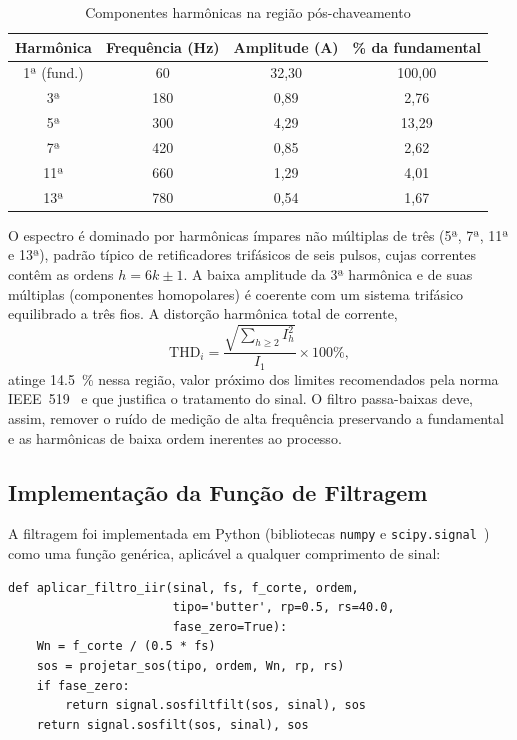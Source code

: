 \documentclass[conference]{IEEEtran}
\begin{document}
\begin{table}[!t]
\caption{Componentes harmônicas na região pós-chaveamento}
\label{tab:harmonicos}
\centering
\begin{tabular}{cccc}
\toprule
Harmônica & Frequência (Hz) & Amplitude (A) & \% da fundamental \\
\midrule
1ª (fund.) & 60  & 32,30 & 100,00 \\
3ª  & 180 & 0,89  & 2,76 \\
5ª  & 300 & 4,29  & 13,29 \\
7ª  & 420 & 0,85  & 2,62 \\
11ª & 660 & 1,29  & 4,01 \\
13ª & 780 & 0,54  & 1,67 \\
\bottomrule
\end{tabular}
\end{table}

O espectro é dominado por harmônicas ímpares não múltiplas de três
(5ª, 7ª, 11ª e 13ª), padrão típico de retificadores trifásicos de seis pulsos,
cujas correntes contêm as ordens $h = 6k \pm 1$. A baixa amplitude da 3ª harmônica
e de suas múltiplas (componentes homopolares) é coerente com um sistema trifásico
equilibrado a três fios. A distorção harmônica total de corrente,
\begin{equation}
\mathrm{THD}_i = \frac{\sqrt{\sum_{h \ge 2} I_h^2}}{I_1}\times 100\%,
\label{eq:thd}
\end{equation}
atinge \SI{14.5}{\percent} nessa região, valor próximo dos limites recomendados
pela norma IEEE~519~\cite{ieee519} e que justifica o tratamento do sinal. O filtro
passa-baixas deve, assim, remover o ruído de medição de alta frequência
preservando a fundamental e as harmônicas de baixa ordem inerentes ao processo.

\subsection{Implementação da Função de Filtragem}
A filtragem foi implementada em Python (bibliotecas \texttt{numpy} e
\texttt{scipy.signal}~\cite{scipy}) como uma função genérica, aplicável a qualquer
comprimento de sinal:

\begin{lstlisting}
def aplicar_filtro_iir(sinal, fs, f_corte, ordem,
                       tipo='butter', rp=0.5, rs=40.0,
                       fase_zero=True):
    Wn = f_corte / (0.5 * fs)
    sos = projetar_sos(tipo, ordem, Wn, rp, rs)
    if fase_zero:
        return signal.sosfiltfilt(sos, sinal), sos
    return signal.sosfilt(sos, sinal), sos
\end{lstlisting}
\end{document}

